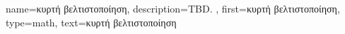 {name={\foreignlanguage{greek}{κυρτή βελτιστοποίηση}},
 	description={TBD. 
  },
	first={\foreignlanguage{greek}{κυρτή βελτιστοποίηση}},
	type=math,
  	text={\foreignlanguage{greek}{κυρτή βελτιστοποίηση}}
}

